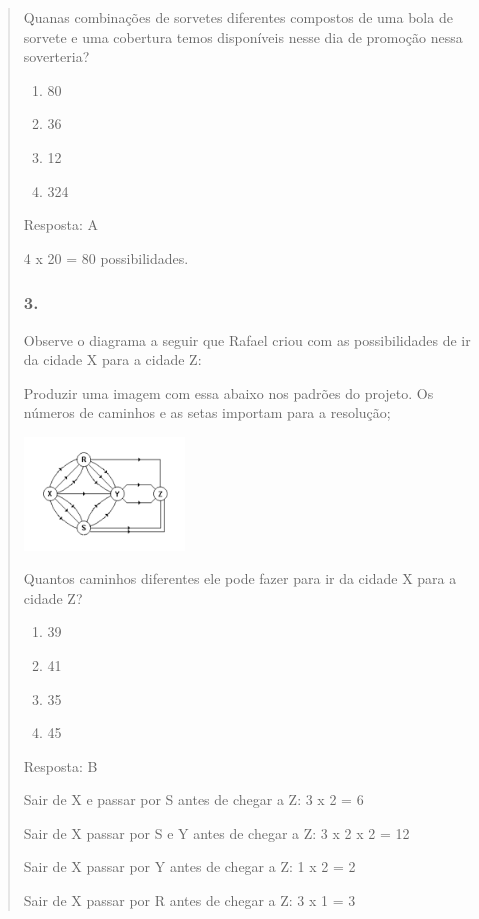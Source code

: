 \begin{enumerate}
\begin{escolha}
\begin{enumerate}
\begin{itemize}
\begin{itemize}
\begin{escolha}
\begin{quote}
\begin{escolha}
{Quanas combinações de sorvetes diferentes compostos de uma bola de
sorvete e uma cobertura temos disponíveis nesse dia de promoção nessa
soverteria?

\begin{enumerate}
\def\labelenumi{\alph{enumi})}
\item
  80
\item
  36
\item
  12
\item
  324
\end{enumerate}

Resposta: A

4 x 20 = 80 possibilidades.

\subsubsection{3.}\label{section-142}

Observe o diagrama a seguir que Rafael criou com as possibilidades de ir
da cidade X para a cidade Z:

Produzir uma imagem com essa abaixo nos padrões do projeto. \textbar{}Os
números de caminhos e as setas importam para a resolução;

\includegraphics[width=1.68348in,height=1.18344in]{media/image141.png}

Quantos caminhos diferentes ele pode fazer para ir da cidade X para a
cidade Z?

\begin{enumerate}
\def\labelenumi{\alph{enumi})}
\item
  39
\item
  41
\item
  35
\item
  45
\end{enumerate}

Resposta: B

Sair de X e passar por S antes de chegar a Z: 3 x 2 = 6

Sair de X passar por S e Y antes de chegar a Z: 3 x 2 x 2 = 12

Sair de X passar por Y antes de chegar a Z: 1 x 2 = 2

Sair de X passar por R antes de chegar a Z: 3 x 1 = 3

}
\end{escolha}
\end{quote}
\end{escolha}
\end{itemize}
\end{itemize}
\end{enumerate}
\end{escolha}
\end{enumerate}
